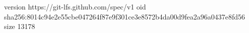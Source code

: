 version https://git-lfs.github.com/spec/v1
oid sha256:8014c94e2e55cbe047264f87e9f301ce3e8572b4da00d9fea2a96a0437e8fd56
size 13178
